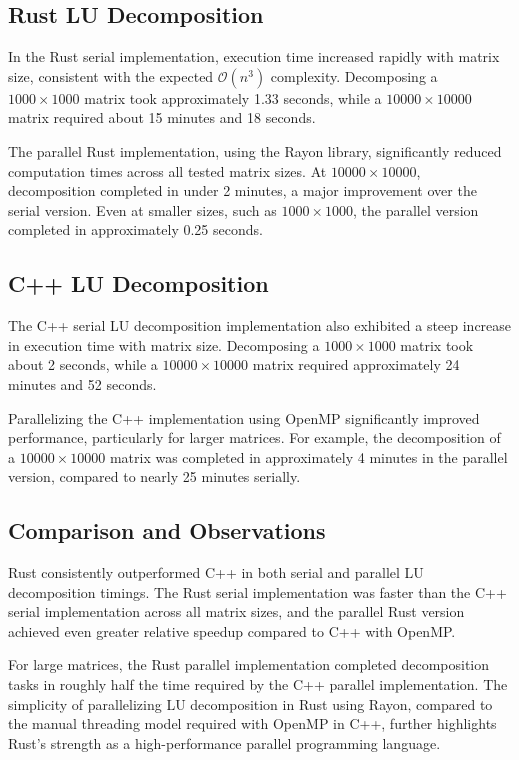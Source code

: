 \documentclass[12pt]{article}
\begin{document}
\subsection*{Rust LU Decomposition}

In the Rust serial implementation, execution time increased rapidly with matrix size, consistent with the expected \( \mathcal{O}(n^3) \) complexity.
Decomposing a \(1000 \times 1000\) matrix took approximately 1.33 seconds, while a \(10000 \times 10000\) matrix required about 15 minutes and 18 seconds.

The parallel Rust implementation, using the Rayon library, significantly reduced computation times across all tested matrix sizes. At \(10000 \times 10000\),
decomposition completed in under 2 minutes, a major improvement over the serial version. Even at smaller sizes, such as \(1000 \times 1000\), the parallel
version completed in approximately 0.25 seconds.

\subsection*{C++ LU Decomposition}

The C++ serial LU decomposition implementation also exhibited a steep increase in execution time with matrix size. Decomposing a \(1000 \times 1000\) matrix
took about 2 seconds, while a \(10000 \times 10000\) matrix required approximately 24 minutes and 52 seconds.

Parallelizing the C++ implementation using OpenMP significantly improved performance, particularly for larger matrices. For example, the decomposition of
a \(10000 \times 10000\) matrix was completed in approximately 4 minutes in the parallel version, compared to nearly 25 minutes serially.

\subsection*{Comparison and Observations}

Rust consistently outperformed C++ in both serial and parallel LU decomposition timings. The Rust serial implementation was faster than the C++ serial
implementation across all matrix sizes, and the parallel Rust version achieved even greater relative speedup compared to C++ with OpenMP.

For large matrices, the Rust parallel implementation completed decomposition tasks in roughly half the time required by the C++ parallel implementation.
The simplicity of parallelizing LU decomposition in Rust using Rayon, compared to the manual threading model required with OpenMP in C++, further highlights
Rust's strength as a high-performance parallel programming language.
\end{document}
